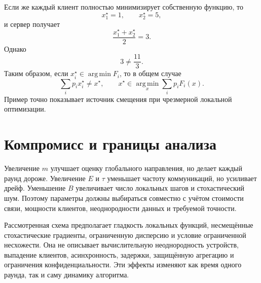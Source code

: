 Если же каждый клиент полностью минимизирует собственную функцию, то
\[
    x_1^\star=1,
    \qquad
    x_2^\star=5,
\]
и сервер получает
\[
    \frac{x_1^\star+x_2^\star}{2}=3.
\]
Однако
\[
    3\ne\frac{11}{3}.
\]
Таким образом, если \(x_i^\star\in\operatorname*{arg\,min}F_i\),
то в общем случае
\[
    \sum_i p_i x_i^\star
    \ne
    x^\star,
    \qquad
    x^\star
    \in
    \operatorname*{arg\,min}_x
    \sum_i p_iF_i(x).
\]
Пример точно показывает источник смещения при чрезмерной локальной
оптимизации.

\section{Компромисс и границы анализа}

Увеличение \(m\) улучшает оценку глобального направления, но делает
каждый раунд дороже. Увеличение \(E\) и \(\tau\) уменьшает частоту
коммуникаций, но усиливает дрейф. Уменьшение \(B\) увеличивает число
локальных шагов и стохастический шум. Поэтому параметры должны
выбираться совместно с учётом стоимости связи, мощности клиентов,
неоднородности данных и требуемой точности.

Рассмотренная схема предполагает гладкость локальных функций,
несмещённые стохастические градиенты, ограниченную дисперсию и условие
ограниченной несхожести. Она не описывает вычислительную
неоднородность устройств, выпадение клиентов, асинхронность, задержки,
защищённую агрегацию и ограничения конфиденциальности. Эти эффекты
изменяют как время одного раунда, так и саму динамику алгоритма.
